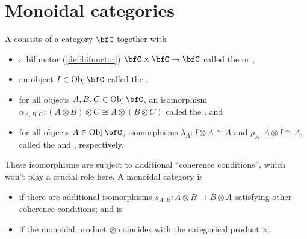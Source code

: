 \documentclass[a5paper]{article}
\begin{document}

\section{Monoidal categories}
\label{sec:monoidal-categories}

\begin{definition}\label{def:monoidal-category}
	A  consists of a category $\bfC$ together with
  \begin{itemize}
    \itemsep-0.2em
    \item a bifunctor (\cref{def:bifunctor}) $\bfC\times \bfC\to \bfC$ called the
       or ,
    \item an object $I\in\Obj\bfC$ called the ,
    \item for all objects $A,B,C\in\Obj\bfC$, an isomorphism
      $\alpha_{A,B,C}:(A\otimes B)\otimes C\cong A\otimes (B\otimes C)$
      called the , and
    \item for all objects $A\in\Obj\bfC$, isomorphisms
      $\lambda_A:I\otimes A\cong A$ and $\rho_A:A\otimes I\cong A$, called
      the  and , respectively.
  \end{itemize}
  These isomorphisms are subject to additional ``coherence conditions'', which
  won't play a crucial role here. A monoidal category is
  \begin{itemize}
    \itemsep-0.2em
    \item {} if there are additional isomorphisms
      $s_{A,B}:A\otimes B\to B\otimes A$ satisfying other coherence conditions; and is
    \item {} if the monoidal product $\otimes $ coincides with the
      categorical product $\times $.
  \end{itemize}
\end{definition}
\end{document}
